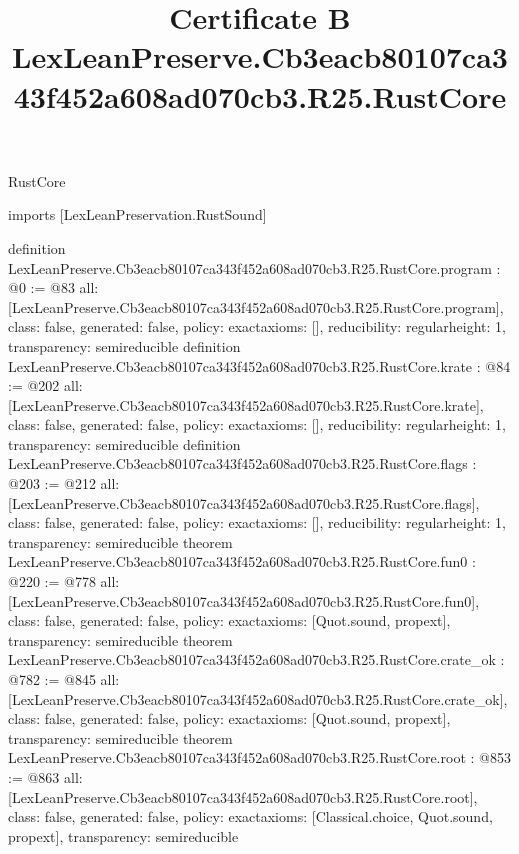 \begin{lexlean}{RustCore}
\title{Certificate B LexLeanPreserve.Cb3eacb80107ca343f452a608ad070cb3.R25.RustCore}
\begin{coremodule}
imports [LexLeanPreservation.RustSound]

definition LexLeanPreserve.Cb3eacb80107ca343f452a608ad070cb3.R25.RustCore.program : @0 := @83 {
  all: [LexLeanPreserve.Cb3eacb80107ca343f452a608ad070cb3.R25.RustCore.program],
  class: false,
  generated: false,
  policy: exact{axioms: []},
  reducibility: regular{height: 1},
  transparency: semireducible
}
definition LexLeanPreserve.Cb3eacb80107ca343f452a608ad070cb3.R25.RustCore.krate : @84 := @202 {
  all: [LexLeanPreserve.Cb3eacb80107ca343f452a608ad070cb3.R25.RustCore.krate],
  class: false,
  generated: false,
  policy: exact{axioms: []},
  reducibility: regular{height: 1},
  transparency: semireducible
}
definition LexLeanPreserve.Cb3eacb80107ca343f452a608ad070cb3.R25.RustCore.flags : @203 := @212 {
  all: [LexLeanPreserve.Cb3eacb80107ca343f452a608ad070cb3.R25.RustCore.flags],
  class: false,
  generated: false,
  policy: exact{axioms: []},
  reducibility: regular{height: 1},
  transparency: semireducible
}
theorem LexLeanPreserve.Cb3eacb80107ca343f452a608ad070cb3.R25.RustCore.fun0 : @220 := @778 {
  all: [LexLeanPreserve.Cb3eacb80107ca343f452a608ad070cb3.R25.RustCore.fun0],
  class: false,
  generated: false,
  policy: exact{axioms: [Quot.sound, propext]},
  transparency: semireducible
}
theorem LexLeanPreserve.Cb3eacb80107ca343f452a608ad070cb3.R25.RustCore.crate_ok : @782 := @845 {
  all: [LexLeanPreserve.Cb3eacb80107ca343f452a608ad070cb3.R25.RustCore.crate_ok],
  class: false,
  generated: false,
  policy: exact{axioms: [Quot.sound, propext]},
  transparency: semireducible
}
theorem LexLeanPreserve.Cb3eacb80107ca343f452a608ad070cb3.R25.RustCore.root : @853 := @863 {
  all: [LexLeanPreserve.Cb3eacb80107ca343f452a608ad070cb3.R25.RustCore.root],
  class: false,
  generated: false,
  policy: exact{axioms: [Classical.choice, Quot.sound, propext]},
  transparency: semireducible
}


\end{coremodule}
\end{lexlean}
